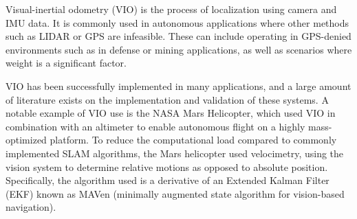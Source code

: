 \documentclass[bare_jrnl_transmag]{subfiles}
\begin{document}
Visual-inertial odometry (VIO) is the process of localization using camera and IMU data. It is commonly used in autonomous applications where other methods such as LIDAR or GPS are infeasible. These can include operating in GPS-denied environments such as in defense or mining applications, as well as scenarios where weight is a significant factor. 

VIO has been successfully implemented in many applications, and a large amount of literature exists on the implementation and validation of these systems. A notable example of VIO use is the NASA Mars Helicopter, which used VIO in combination with an altimeter to enable autonomous flight on a highly mass-optimized platform. To reduce the computational load compared to commonly implemented SLAM algorithms, the Mars helicopter used velocimetry, using the vision system to determine relative motions as opposed to absolute position. Specifically, the algorithm used is a derivative of an Extended Kalman Filter (EKF) known as MAVen (minimally augmented state algorithm for vision-based navigation). 
\end{document}
